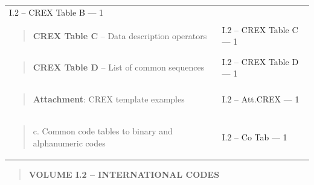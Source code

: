 \begin{longtable}[]{@{}ll@{}}
\begin{minipage}[t]{0.47\columnwidth}
I.2 -- CREX Table B --- 1\strut
\end{minipage}\tabularnewline
\begin{minipage}[t]{0.47\columnwidth}\raggedright
\begin{quote}
\textbf{CREX Table C} -- Data description operators
\end{quote}\strut
\end{minipage} & \begin{minipage}[t]{0.47\columnwidth}\raggedright
I.2 -- CREX Table C --- 1\strut
\end{minipage}\tabularnewline
\begin{minipage}[t]{0.47\columnwidth}\raggedright
\begin{quote}
\textbf{CREX Table D} -- List of common sequences
\end{quote}\strut
\end{minipage} & \begin{minipage}[t]{0.47\columnwidth}\raggedright
I.2 -- CREX Table D --- 1\strut
\end{minipage}\tabularnewline
\begin{minipage}[t]{0.47\columnwidth}\raggedright
\begin{quote}
\textbf{Attachment}: CREX template examples
\end{quote}\strut
\end{minipage} & \begin{minipage}[t]{0.47\columnwidth}\raggedright
I.2 -- Att.CREX --- 1\strut
\end{minipage}\tabularnewline
\begin{minipage}[t]{0.47\columnwidth}\raggedright
\begin{quote}
c. Common code tables to binary and alphanumeric codes
\end{quote}\strut
\end{minipage} & \begin{minipage}[t]{0.47\columnwidth}\raggedright
I.2 -- Co Tab --- 1\strut
\end{minipage}\tabularnewline
\bottomrule
\end{longtable}

\begin{quote}
\textbf{VOLUME I.2 -- INTERNATIONAL CODES}
\end{quote}

